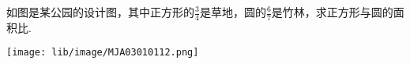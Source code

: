 如图是某公园的设计图，其中正方形的$\frac{3}{4}$是草地，圆的$\frac{6}{7}$是竹林，求正方形与圆的面积比. \\

\begin{flushright}

    \texttt{[image: lib/image/MJA03010112.png]}

\end{flushright} 





